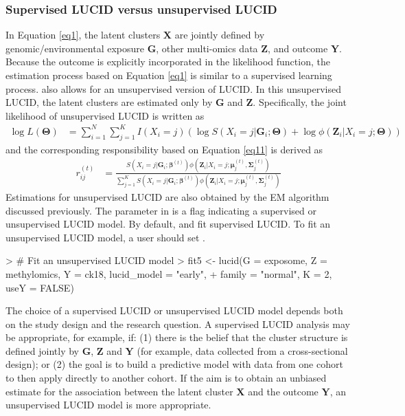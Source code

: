\subsubsection{Supervised LUCID versus unsupervised LUCID} \label{sec3.1.2}
In Equation \ref{eq1}, the latent clusters $\bm X$ are jointly defined by genomic/environmental exposure $\bm G$, other multi-omics data $\bm Z$, and outcome $\bm Y$. Because the outcome is explicitly incorporated in the likelihood function, the estimation process based on Equation \ref{eq1} is similar to a supervised learning process.  also allows for an unsupervised version of LUCID. In this unsupervised LUCID, the latent clusters are estimated only by $\bm G$ and $\bm Z$. Specifically, the joint likelihood of unsupervised LUCID is written as
\begin{equation}
    \begin{aligned}
         \log L(\bm{\Theta}) & = \sum_{i = 1}^N \sum_{j=1}^K I(X_i = j) \left( \log S(X_i = j| \bm{G}_i; \bm{\Theta}) + \log \phi(\bm{Z}_i| X_i = j; \bm{\Theta})\right)
    \end{aligned}
    \label{eq11}
\end{equation}
and the corresponding responsibility based on Equation \ref{eq11} is derived as
\begin{equation}
    \begin{aligned}
        r_{ij}^{(t)} & = \frac{S\left(X_i = j| \bm{G}_i; \bm{\beta}^{(t)}\right) \phi\left(\bm{Z}_i| X_i = j; \bm{\mu}_j^{(t)}, \bm{\Sigma}_j^{(t)}\right)}{\sum_{j = 1}^K S\left(X_i = j| \bm{G}_i; \bm{\beta}^{(t)}\right) \phi\left(\bm{Z}_i| X_i = j; \bm{\mu}_j^{(t)}, \bm{\Sigma}_j^{(t)}\right)}
    \end{aligned}
    \label{eq12}
\end{equation}
Estimations for unsupervised LUCID are also obtained by the EM algorithm discussed previously. The parameter  in  is a flag indicating a supervised or unsupervised LUCID model. By default,  and  fit supervised LUCID. To fit an unsupervised LUCID model, a user should set .
\begin{example}
> # Fit an unsupervised LUCID model
> fit5 <- lucid(G = exposome, Z = methylomics, Y = ck18, lucid_model = "early", 
+               family = "normal", K = 2, useY = FALSE)
\end{example}
The choice of a supervised LUCID or unsupervised LUCID model depends both on the study design and the research question. A supervised LUCID analysis may be appropriate, for example, if: (1) there is the belief that the cluster structure is defined jointly by $\bm G$, $\bm Z$ and $\bm Y$ (for example, data collected from a cross-sectional design); or (2) the goal is to build a predictive model with data from one cohort to then apply directly to another cohort. If the aim is to obtain an unbiased estimate for the association between the latent cluster $\bm X$ and the outcome $\bm Y$, an unsupervised LUCID model is more appropriate. 


